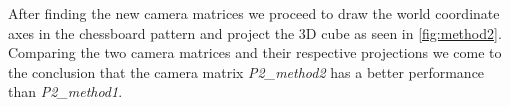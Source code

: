 After finding the new camera matrices we proceed to draw the world coordinate axes in the chessboard pattern and project the 3D cube as seen in \ref{fig:method2}.\newline
Comparing the two camera matrices and their respective projections we come to the conclusion that the camera matrix \textsl{P2_method2} has a better performance than \textsl{P2_method1}. 	

